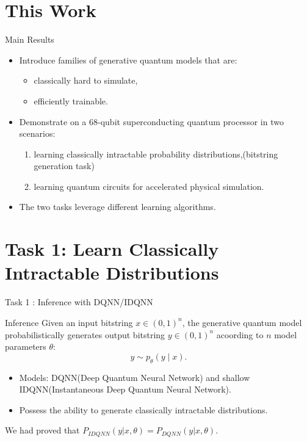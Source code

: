 \documentclass[aspectratio=169]{beamer}
\begin{document}
\section{This Work}

\begin{frame}{Main Results}
  \begin{itemize}
    \item Introduce families of generative quantum models that are:
    \begin{itemize}
      \item classically hard to simulate,
      \item efficiently trainable.
    \end{itemize}
    \item Demonstrate on a 68-qubit superconducting quantum processor in two scenarios:
    \begin{enumerate}
      \item learning classically intractable probability distributions,(bitstring generation task)
      \item learning quantum circuits for accelerated physical simulation.
    \end{enumerate}
    \item The two tasks leverage different learning algorithms.
  \end{itemize}
\end{frame}

\section{Task 1: Learn Classically Intractable Distributions}

\begin{frame}{Task 1 : Inference with DQNN/IDQNN}
  \begin{block}{Inference }
    Given an input bitstring $x\in (0,1)^n$, the generative quantum model probabilistically generates output bitstring $y\in (0,1)^n$ acoording to $n$ model parameters $\theta$:
    \[
      y \sim p_\theta(y\mid x).
    \]
  \end{block}

  \begin{itemize}
    \item Models: DQNN(Deep Quantum Neural Network) and shallow IDQNN(Instantaneous Deep Quantum Neural Network).
    \item Possess the ability to generate classically intractable distributions.
  \end{itemize}
  We had proved that $P_{IDQNN}(y | x,\theta) = P_{DQNN}(y | x,\theta)$.
\end{frame}
\end{document}
